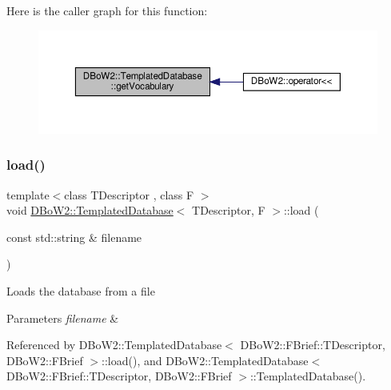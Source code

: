 Here is the caller graph for this function\+:\nopagebreak
\begin{figure}[H]
\begin{center}
\leavevmode
\includegraphics[width=350pt]{classDBoW2_1_1TemplatedDatabase_a2053ce792884183af75e4343026ef7dd_icgraph}
\end{center}
\end{figure}
\mbox{\label{classDBoW2_1_1TemplatedDatabase_aff1528af5cff047539eb1e2c75fb6345}} 
\subsubsection{\texorpdfstring{load()}{load()}\hspace{0.1cm}{\footnotesize\ttfamily [1/2]}}
{\footnotesize\ttfamily template$<$class T\+Descriptor , class F $>$ \\
void \hyperlink{classDBoW2_1_1TemplatedDatabase}{D\+Bo\+W2\+::\+Templated\+Database}$<$ T\+Descriptor, F $>$\+::load (\begin{DoxyParamCaption}\item[{const std\+::string \&}]{filename }\end{DoxyParamCaption})}

Loads the database from a file 
\begin{DoxyParams}{Parameters}
{\em filename} & \\
\hline
\end{DoxyParams}


Referenced by D\+Bo\+W2\+::\+Templated\+Database$<$ D\+Bo\+W2\+::\+F\+Brief\+::\+T\+Descriptor, D\+Bo\+W2\+::\+F\+Brief $>$\+::load(), and D\+Bo\+W2\+::\+Templated\+Database$<$ D\+Bo\+W2\+::\+F\+Brief\+::\+T\+Descriptor, D\+Bo\+W2\+::\+F\+Brief $>$\+::\+Templated\+Database().

